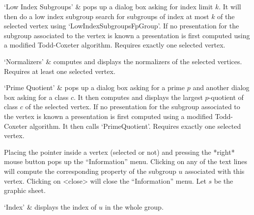 `Low Index Subgroups' &
pops up a dialog box asking for index  limit $k$.  It  will then do a low
index subgroup search for  subgroups of index at  most $k$ of the selected
vertex using `LowIndexSubgroupsFpGroup'.    If no  presentation  for  the
subgroup   associated to  the vertex  is  known a  presentation  is first
computed using a  modified  Todd-Coxeter algorithm. Requires  exactly one
selected vertex.

`Normalizers' &
computes and displays the normalizers of the selected vertices.  Requires
at least one selected vertex.

`Prime Quotient' &
pops up a dialog box asking for a prime $p$ and another dialog box asking
for a class $c$.  It then  computes and displays the largest $p$-quotient
of class $c$ of the selected vertex.  If no presentation for the subgroup
associated to the vertex is known a  presentation is first computed using
a   modified  Todd-Coxeter algorithm.   It    then calls `PrimeQuotient'.
Requires exactly one selected vertex.
\enditems

%
%
%
%
%
%
%
%
%


Placing the pointer  inside a vertex (selected  or not) and  pressing the
*right* mouse button pops up the ``Information''  menu.  Clicking on any of
the text  lines will compute the corresponding   property of the subgroup
$u$  associated  with this  vertex. Clicking  on <close>  will  close the
``Information'' menu.  Let $s$ be the graphic sheet.

\beginitems
`Index' &
displays  the index of  $u$ in the whole  group.

